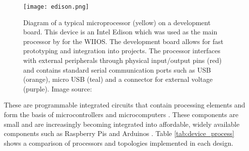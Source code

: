 \begin{figure}[H]
	\centering
	\texttt{[image: edison.png]}
	\caption{Diagram of a typical microprocessor (yellow) on a development board. This device is an Intel Edison which was used as the main processor by \textcite{kohout2015device} for the WIIOS. The development board allows for fast prototyping and integration into projects. The processor interfaces with external peripherals through physical input/output pins (red) and contains standard serial communication ports such as USB (orange), micro USB (teal) and a connector for external voltage (purple). Image source: \cite{edison} }
\end{figure}

These are programmable integrated circuits that contain processing elements \cite{subham2018micro} and form the basis of microcontrollers and microcomputers \cite{crisp2003introduction}. These components are small and are increasingly becoming integrated into affordable, widely available components such as Raspberry Pis and Arduinos \cite{rabault2019open}. Table \ref{tab:device_process} shows a comparison of processors and topologies implemented in each design.

